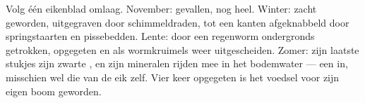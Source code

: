 \begin{example}\label{ex:g6:decomposers-and-soil:leaf}
Volg één eikenblad omlaag. November: gevallen, nog heel. Winter: zacht
geworden, uitgegraven door schimmeldraden, tot een kanten 
afgeknabbeld door springstaarten en pissebedden. Lente: door een
regenworm ondergronds getrokken, opgegeten en als wormkruimels weer
uitgescheiden. Zomer: zijn laatste stukjes zijn zwarte , en zijn
mineralen rijden mee in het bodemwater --- een  in, misschien wel
die van de eik zelf. Vier keer opgegeten is het  voedsel voor zijn
eigen boom geworden.
\end{example}

